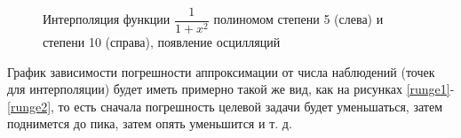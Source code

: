 \documentclass[a4paper]{article}
\begin{document}
\begin{figure}[!h]
  \begin{minipage}[h]{0.49\linewidth}
  \end{minipage}
  \hfill
  \begin{minipage}[h]{0.49\linewidth}
  \end{minipage}
  \caption{Интерполяция функции $\dfrac{1}{1+x^2}$ полиномом степени 5 (слева) и степени 10 (справа), появление осцилляций}
  \label{l1}
\end{figure}

График зависимости погрешности аппроксимации от числа наблюдений (точек для интерполяции) будет иметь примерно такой же вид, как на рисунках \ref{runge1}-\ref{runge2}, то есть
сначала погрешность целевой задачи будет уменьшаться, затем поднимется до пика, затем опять уменьшится и т. д.
\end{document}
